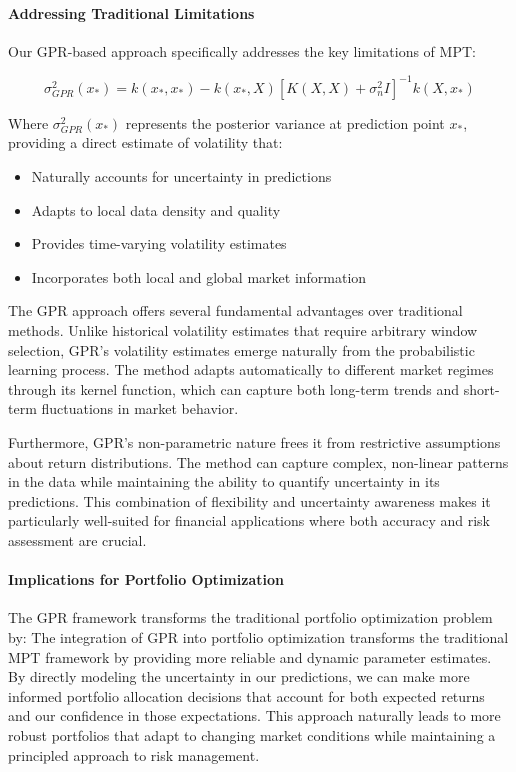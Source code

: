 \paragraph{Addressing Traditional Limitations}
Our \ac{GPR}-based approach specifically addresses the key limitations of \ac{MPT}:

\begin{equation}
    \sigma_{GPR}^2(x_*) = k(x_*, x_*) - k(x_*, X)[K(X,X) + \sigma_n^2I]^{-1}k(X, x_*)
    \label{eq:gpr_variance}
\end{equation}

Where $\sigma_{GPR}^2(x_*)$ represents the posterior variance at prediction point $x_*$, providing a direct estimate of volatility that:

\begin{itemize}
    \item Naturally accounts for uncertainty in predictions
    \item Adapts to local data density and quality
    \item Provides time-varying volatility estimates
    \item Incorporates both local and global market information
\end{itemize}

The \ac{GPR} approach offers several fundamental advantages over traditional methods. Unlike historical volatility estimates that require arbitrary window selection, \ac{GPR}'s volatility estimates emerge naturally from the probabilistic learning process. The method adapts automatically to different market regimes through its kernel function, which can capture both long-term trends and short-term fluctuations in market behavior.

Furthermore, \ac{GPR}'s non-parametric nature frees it from restrictive assumptions about return distributions. The method can capture complex, non-linear patterns in the data while maintaining the ability to quantify uncertainty in its predictions. This combination of flexibility and uncertainty awareness makes it particularly well-suited for financial applications where both accuracy and risk assessment are crucial.


\paragraph{Implications for Portfolio Optimization}
The \ac{GPR} framework transforms the traditional portfolio optimization problem by:
The integration of \ac{GPR} into portfolio optimization transforms the traditional \ac{MPT} framework by providing more reliable and dynamic parameter estimates. By directly modeling the uncertainty in our predictions, we can make more informed portfolio allocation decisions that account for both expected returns and our confidence in those expectations. This approach naturally leads to more robust portfolios that adapt to changing market conditions while maintaining a principled approach to risk management.

